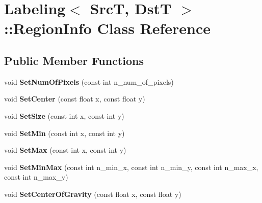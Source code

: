 \hypertarget{class_labeling_1_1_region_info}{}\section{Labeling$<$ SrcT, DstT $>$\+:\+:Region\+Info Class Reference}
\label{class_labeling_1_1_region_info}
\subsection*{Public Member Functions}
\begin{DoxyCompactItemize}
\item 
\hypertarget{class_labeling_1_1_region_info_a628e08b513def13ce73f6bdbb2ad49cc}{}\label{class_labeling_1_1_region_info_a628e08b513def13ce73f6bdbb2ad49cc} 
void {\bfseries Set\+Num\+Of\+Pixels} (const int n\+\_\+num\+\_\+of\+\_\+pixels)
\item 
\hypertarget{class_labeling_1_1_region_info_a18233b64cd08822e6ed2eb5d2541178c}{}\label{class_labeling_1_1_region_info_a18233b64cd08822e6ed2eb5d2541178c} 
void {\bfseries Set\+Center} (const float x, const float y)
\item 
\hypertarget{class_labeling_1_1_region_info_a60a72592f3177344c7f35a5ce6f9ea51}{}\label{class_labeling_1_1_region_info_a60a72592f3177344c7f35a5ce6f9ea51} 
void {\bfseries Set\+Size} (const int x, const int y)
\item 
\hypertarget{class_labeling_1_1_region_info_a4e515a1846f9ff44f564c1e062122b78}{}\label{class_labeling_1_1_region_info_a4e515a1846f9ff44f564c1e062122b78} 
void {\bfseries Set\+Min} (const int x, const int y)
\item 
\hypertarget{class_labeling_1_1_region_info_a8a3d7201cab55adeb47d1da201d4206d}{}\label{class_labeling_1_1_region_info_a8a3d7201cab55adeb47d1da201d4206d} 
void {\bfseries Set\+Max} (const int x, const int y)
\item 
\hypertarget{class_labeling_1_1_region_info_aa16d4a02f4ca759d654a81e96b9a02c1}{}\label{class_labeling_1_1_region_info_aa16d4a02f4ca759d654a81e96b9a02c1} 
void {\bfseries Set\+Min\+Max} (const int n\+\_\+min\+\_\+x, const int n\+\_\+min\+\_\+y, const int n\+\_\+max\+\_\+x, const int n\+\_\+max\+\_\+y)
\item 
\hypertarget{class_labeling_1_1_region_info_a517b8b2b94aa9d0e19cb216114f66463}{}\label{class_labeling_1_1_region_info_a517b8b2b94aa9d0e19cb216114f66463} 
void {\bfseries Set\+Center\+Of\+Gravity} (const float x, const float y)

\end{DoxyCompactItemize}
